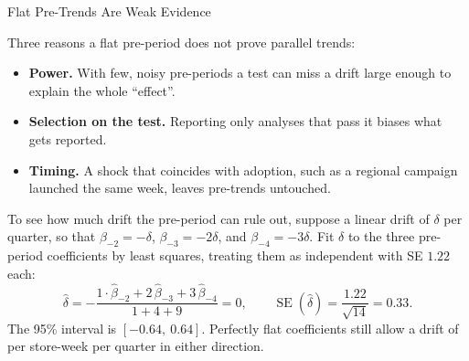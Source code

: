 \documentclass[aspectratio=169, 11pt, handout]{beamer}
\newcommand{\SE}{\operatorname{SE}}
\begin{document}
\begin{frame}{Flat Pre-Trends Are Weak Evidence}

Three reasons a flat pre-period does not prove parallel trends:

\begin{itemize}
  \item \textbf{Power.} With few, noisy pre-periods a test can miss a drift large enough to explain the whole ``effect''.
  \item \textbf{Selection on the test.} Reporting only analyses that pass it biases what gets reported.
  \item \textbf{Timing.} A shock that coincides with adoption, such as a regional campaign launched the same week, leaves pre-trends untouched.
\end{itemize}

\medskip

To see how much drift the pre-period can rule out, suppose a linear drift of $\delta$ per quarter, so that $\beta_{-2} = -\delta$, $\beta_{-3} = -2\delta$, and $\beta_{-4} = -3\delta$. Fit $\delta$ to the three pre-period coefficients by least squares, treating them as independent with SE $1.22$ each:
\[
\hat\delta = -\frac{1 \cdot \hat\beta_{-2} + 2\,\hat\beta_{-3} + 3\,\hat\beta_{-4}}{1 + 4 + 9} = 0, \qquad
\SE(\hat\delta) = \frac{1.22}{\sqrt{14}} = 0.33 .
\]
The 95\% interval is $[-0.64,\ 0.64]$. Perfectly flat coefficients still allow a drift of  per store-week per quarter in either direction.
\end{frame}
\end{document}
